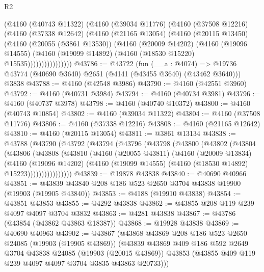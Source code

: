 \begin{lexlean}{R2}
\begin{coremodule}
              (@4160
                (@40743 @11322)
                (@4160
                  (@39034 @11776)
                  (@4160
                    (@37508 @12216)
                    (@4160
                      (@37338 @12642)
                      (@4160
                        (@21165 @13054)
                        (@4160
                          (@20115 @13450)
                          (@4160
                            (@20055 (@3861 @13530))
                            (@4160
                              (@20009 @14202)
                              (@4160
                                (@19096 @14555)
                                (@4160 (@19099 @14892) (@4160 (@18530 @15220) @15535))))))))))))))))
@43786 := @43722
    (fun (__a : @4074) => @19736 @43774 (@40690 @3640) @2651 (@4141 (@43455 @3640) (@43462 @3640)))
    @3838
@43788 := @4160 (@42548 @3986)
@43790 := @4160 (@42551 @3960)
@43792 := @4160 (@40731 @3984)
@43794 := @4160 (@40734 @3981)
@43796 := @4160 (@40737 @3978)
@43798 := @4160 (@40740 @10372)
@43800 := @4160 (@40743 @10854)
@43802 := @4160 (@39034 @11322)
@43804 := @4160 (@37508 @11776)
@43806 := @4160 (@37338 @12216)
@43808 := @4160 (@21165 @12642)
@43810 := @4160 (@20115 @13054)
@43811 := @3861 @13134
@43838 := @43788
    (@43790
      (@43792
        (@43794
          (@43796
            (@43798
              (@43800
                (@43802
                  (@43804
                    (@43806
                      (@43808
                        (@43810
                          (@4160
                            (@20055 @43811)
                            (@4160
                              (@20009 @13834)
                              (@4160
                                (@19096 @14202)
                                (@4160 (@19099 @14555) (@4160 (@18530 @14892) @15223))))))))))))))))
@43839 := @19878 @43838
@43840 := @40690 @40966
@43851 := @43839 @43840 @208 @186 @523 @2650 @3704 @43838 @19900 (@19903 (@19905 @43840))
@43853 := @4188 (@19910 @43838)
@43854 := @43851 @43853
@43855 := @4292 @43838
@43862 := @43855 @208 @119 @239 @4097 @4097 @3704 @3832
@43863 := @4281 @43838
@43867 := @43786 (@43854 (@43862 @43863 @18387))
@43868 := @19928 @43838
@43869 := @40690 @40963
@43902 := @43867
    (@43868
      @43869
      @208
      @186
      @523
      @2650
      @24085
      (@19903 (@19905 @43869))
      (@43839
        @43869
        @409
        @186
        @592
        @2649
        @3704
        @43838
        @24085
        (@19903 (@20015 @43869))
        @43853
        (@43855 @409 @119 @239 @4097 @4097 @3704 @3835 @43863 @20733)))

\end{coremodule}
\end{lexlean}
